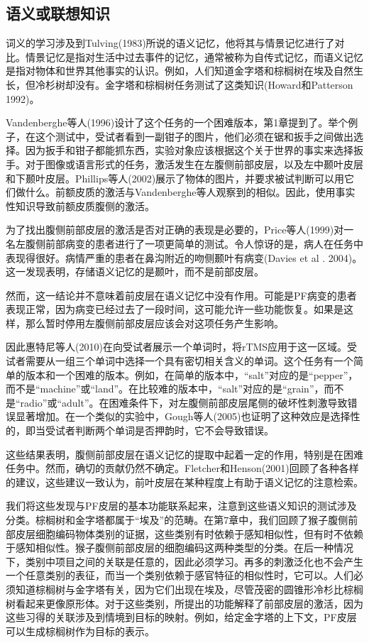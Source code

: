 \subsection{语义或联想知识}
\par
词义的学习涉及到Tulving(1983)所说的语义记忆，他将其与情景记忆进行了对比。情景记忆是指对生活中过去事件的记忆，通常被称为自传式记忆，而语义记忆是指对物体和世界其他事实的认识。例如，人们知道金字塔和棕榈树在埃及自然生长，但冷杉树却没有。金字塔和棕榈树任务测试了这类知识(Howard和Patterson 1992)。
\par
Vandenberghe等人(1996)设计了这个任务的一个困难版本，第1章提到了。举个例子，在这个测试中，受试者看到一副钳子的图片，他们必须在锯和扳手之间做出选择。因为扳手和钳子都能抓东西，实验对象应该根据这个关于世界的事实来选择扳手。对于图像或语言形式的任务，激活发生在左腹侧前部皮层，以及左中颞叶皮层和下颞叶皮层。Phillips等人(2002)展示了物体的图片，并要求被试判断可以用它们做什么。前额皮质的激活与Vandenberghe等人观察到的相似。因此，使用事实性知识导致前额皮质腹侧的激活。
\par
为了找出腹侧前部皮层的激活是否对正确的表现是必要的，Price等人(1999)对一名左腹侧前部病变的患者进行了一项更简单的测试。令人惊讶的是，病人在任务中表现得很好。病情严重的患者在鼻沟附近的吻侧颞叶有病变(Davies et al . 2004)。这一发现表明，存储语义记忆的是颞叶，而不是前部皮层。
\par
然而，这一结论并不意味着前皮层在语义记忆中没有作用。可能是PF病变的患者表现正常，因为病变已经过去了一段时间，这可能允许一些功能恢复。如果是这样，那么暂时停用左腹侧前部皮层应该会对这项任务产生影响。
\par
因此惠特尼等人(2010)在向受试者展示一个单词时，将rTMS应用于这一区域。受试者需要从一组三个单词中选择一个具有密切相关含义的单词。这个任务有一个简单的版本和一个困难的版本。例如，在简单的版本中，“salt”对应的是“pepper”，而不是“machine”或“land”。在比较难的版本中，“salt”对应的是“grain”，而不是“radio”或“adult”。在困难条件下，对左腹侧前部皮层尾侧的破坏性刺激导致错误显著增加。在一个类似的实验中，Gough等人(2005)也证明了这种效应是选择性的，即当受试者判断两个单词是否押韵时，它不会导致错误。
\par
这些结果表明，腹侧前部皮层在语义记忆的提取中起着一定的作用，特别是在困难任务中。然而，确切的贡献仍然不确定。Fletcher和Henson(2001)回顾了各种各样的建议，这些建议一致认为，前叶皮层在某种程度上有助于语义记忆的注意检索。
\par
我们将这些发现与PF皮层的基本功能联系起来，注意到这些语义知识的测试涉及分类。棕榈树和金字塔都属于“埃及”的范畴。在第7章中，我们回顾了猴子腹侧前部皮层细胞编码物体类别的证据，这些类别有时依赖于感知相似性，但有时不依赖于感知相似性。猴子腹侧前部皮层的细胞编码这两种类型的分类。在后一种情况下，类别中项目之间的关联是任意的，因此必须学习。再多的刺激泛化也不会产生一个任意类别的表征，而当一个类别依赖于感官特征的相似性时，它可以。人们必须知道棕榈树与金字塔有关，因为它们出现在埃及，尽管茂密的圆锥形冷杉比棕榈树看起来更像原形体。对于这些类别，所提出的功能解释了前部皮层的激活，因为这些习得的关联涉及到情境到目标的映射。例如，给定金字塔的上下文，PF皮层可以生成棕榈树作为目标的表示。
